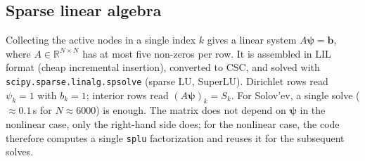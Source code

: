\documentclass[11pt,a4paper]{article}
\begin{document}
\subsection{Sparse linear algebra}
Collecting the active nodes in a single index $k$ gives a linear system $A\bm\psi=\bm b$, where $A\in\mathbb R^{N\times N}$ has at most five non-zeros per row. It is assembled in LIL format (cheap incremental insertion), converted to CSC, and solved with \texttt{scipy.sparse.linalg.spsolve} (sparse LU, SuperLU). Dirichlet rows read $\psi_k=1$ with $b_k=1$; interior rows read $(A\bm\psi)_k=S_k$. For Solov'ev, a single solve ($\approx 0.1$\,s for $N\approx6000$) is enough. The matrix does not depend on $\bm\psi$ in the nonlinear case, only the right-hand side does; for the nonlinear case, the code therefore computes a single \texttt{splu} factorization and reuses it for the subsequent solves. 
\end{document}
